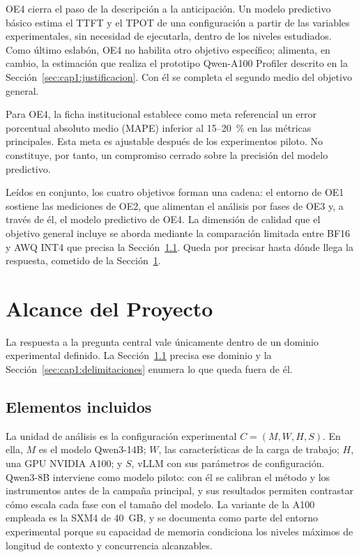 OE4 cierra el paso de la descripción a la anticipación. Un modelo predictivo básico estima el TTFT y el TPOT de una configuración a partir de las variables experimentales, sin necesidad de ejecutarla, dentro de los niveles estudiados. Como último eslabón, OE4 no habilita otro objetivo específico; alimenta, en cambio, la estimación que realiza el prototipo Qwen-A100 Profiler descrito en la Sección~\ref{sec:cap1:justificacion}. Con él se completa el segundo medio del objetivo general.

Para OE4, la ficha institucional establece como meta referencial un error porcentual absoluto medio (MAPE) inferior al 15--20~\% en las métricas principales. Esta meta es ajustable después de los experimentos piloto. No constituye, por tanto, un compromiso cerrado sobre la precisión del modelo predictivo.

Leídos en conjunto, los cuatro objetivos forman una cadena: el entorno de OE1 sostiene las mediciones de OE2, que alimentan el análisis por fases de OE3 y, a través de él, el modelo predictivo de OE4. La dimensión de calidad que el objetivo general incluye se aborda mediante la comparación limitada entre BF16 y AWQ INT4 que precisa la Sección~\ref{sec:cap1:alcance-incluye}. Queda por precisar hasta dónde llega la respuesta, cometido de la Sección~\ref{sec:cap1:alcance}.

\section{Alcance del Proyecto}
\label{sec:cap1:alcance}

La respuesta a la pregunta central vale únicamente dentro de un dominio experimental definido. La Sección~\ref{sec:cap1:alcance-incluye} precisa ese dominio y la Sección~\ref{sec:cap1:delimitaciones} enumera lo que queda fuera de él.

\subsection{Elementos incluidos}
\label{sec:cap1:alcance-incluye}

La unidad de análisis es la configuración experimental $C = (M, W, H, S)$. En ella, $M$ es el modelo Qwen3-14B; $W$, las características de la carga de trabajo; $H$, una GPU NVIDIA A100; y $S$, vLLM con sus parámetros de configuración. Qwen3-8B interviene como modelo piloto: con él se calibran el método y los instrumentos antes de la campaña principal, y sus resultados permiten contrastar cómo escala cada fase con el tamaño del modelo. La variante de la A100 empleada es la SXM4 de 40~GB, y se documenta como parte del entorno experimental porque su capacidad de memoria condiciona los niveles máximos de longitud de contexto y concurrencia alcanzables.

